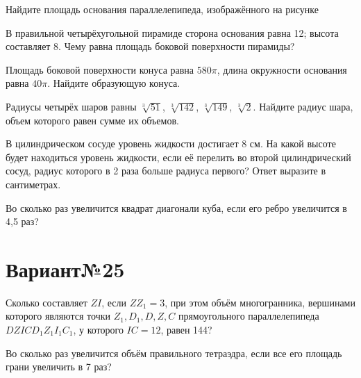 \documentclass[4apaper]{article}
\begin{document}
\begin{taskBN}{1}
Найдите площадь основания параллелепипеда, изображённого на рисунке
\end{taskBN}

\begin{taskBN}{2}
В правильной четырёхугольной пирамиде сторона основания равна 12; высота составляет 8. Чему равна площадь боковой поверхности пирамиды?
\end{taskBN}

\begin{taskBN}{3}
Площадь боковой поверхности конуса равна $580\pi$, длина окружности основания равна $40\pi$. Найдите образующую конуса. 
\end{taskBN}

\begin{taskBN}{4}
Радиусы четырёх шаров равны $\sqrt[3]{51}$, $\sqrt[3]{142}$, $\sqrt[3]{149}$, $\sqrt[3]{2}$. Найдите радиус шара, объем которого равен сумме их объемов.
\end{taskBN}

\begin{taskBN}{5}
В цилиндрическом сосуде уровень жидкости достигает 8 см. На какой высоте будет находиться уровень жидкости, если её перелить во второй цилиндрический сосуд, радиус которого в 2 раза больше радиуса первого? Ответ выразите в сантиметрах.
\end{taskBN}

\begin{taskBN}{6}
Во сколько раз увеличится квадрат диагонали куба, если его ребро увеличится в 4,5 раз?
\end{taskBN}
\newpage\section*{Вариант№25}

\begin{taskBN}{1}
Сколько составляет  $ZI$, если $ZZ_1=3$, при этом объём многогранника, вершинами которого являются точки $Z_1,D_1,D,Z,C$ прямоугольного параллелепипеда $DZICD_1Z_1I_1C_1$, у которого $IC = 12$, равен 144? 
\end{taskBN}

\begin{taskBN}{2}
Во сколько раз увеличится объём правильного тетраэдра, если все его площадь грани увеличить в 7 раз?
\end{taskBN}
\end{document}
